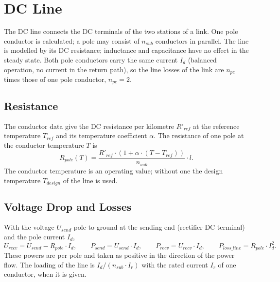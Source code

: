 \section{DC Line}
\label{sec:dc-line}

The DC line connects the DC terminals of the two stations of a link. One pole conductor is calculated; a pole may
consist of $n_{sub}$ conductors in parallel. The line is modelled by its DC resistance; inductance and capacitance
have no effect in the steady state. Both pole conductors carry the same current $I_d$ (balanced operation, no current
in the return path), so the line losses of the link are $n_{pc}$ times those of one pole conductor, $n_{pc} = 2$.

\subsection{Resistance}

The conductor data give the DC resistance per kilometre $R'_{ref}$ at the reference temperature $T_{ref}$ and its
temperature coefficient $\alpha$. The resistance of one pole at the conductor temperature $T$ is
\begin{equation}
  R_{pole}(T) = \frac{R'_{ref} \cdot \left( 1 + \alpha \cdot (T - T_{ref}) \right)}{n_{sub}} \cdot l .
\end{equation}
The conductor temperature is an operating value; without one the design temperature $T_{design}$ of the line is
used.

\subsection{Voltage Drop and Losses}

With the voltage $U_{send}$ pole-to-ground at the sending end (rectifier DC terminal) and the pole current $I_d$,
\begin{equation}
  U_{recv} = U_{send} - R_{pole} \cdot I_d , \qquad
  P_{send} = U_{send} \cdot I_d , \qquad
  P_{recv} = U_{recv} \cdot I_d , \qquad
  P_{loss\_line} = R_{pole} \cdot I_d^2 .
\end{equation}
These powers are per pole and taken as positive in the direction of the power flow. The loading of the line is
$I_d / (n_{sub} \cdot I_r)$ with the rated current $I_r$ of one conductor, when it is given.

